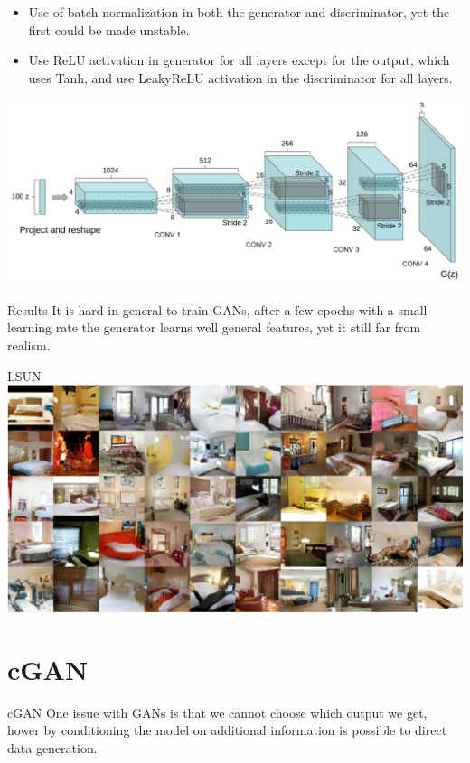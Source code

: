 \documentclass{beamer}
\begin{document}
\begin{frame}
    \begin{itemize}
        \item Use of batch normalization in both the generator and discriminator, yet the first could be made unstable.
        \item Use ReLU activation in generator for all layers except for the output, which uses Tanh, and use LeakyReLU activation in the discriminator for all layers.
    \end{itemize}
\end{frame}

\begin{frame}
    \centering
    \includegraphics[scale=0.37]{images/dcgan-scheme.png}
\end{frame}

\begin{frame}{Results}
    It is hard in general to train GANs, after a few epochs with a small learning rate the generator learns well general features, yet it still far from realism.
\end{frame}

\begin{frame}{LSUN}
    \centering
    \includegraphics[scale=0.35]{images/dcgan-results.png}
\end{frame}

\section{cGAN}
\begin{frame}{cGAN}
    One issue with GANs is that we cannot choose which output we get, hower by conditioning the model on additional information is possible to direct data generation.
\end{frame}
\end{document}
